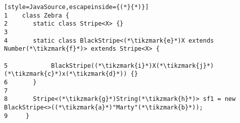 \documentclass{article}
\begin{document}


\begin{lstlisting}[style=JavaSource,escapeinside={(*}{*)}]
1    class Zebra {
2       static class Stripe<X> {}
3
4       static class BlackStripe<(*\tikzmark{e}*)X extends Number(*\tikzmark{f}*)> extends Stripe<X> {
       
5            BlackStripe((*\tikzmark{i}*)X(*\tikzmark{j}*) (*\tikzmark{c}*)x(*\tikzmark{d}*)) {}
6       }
7
8       Stripe<(*\tikzmark{g}*)String(*\tikzmark{h}*)> sf1 = new BlackStripe<>((*\tikzmark{a}*)"Marty"(*\tikzmark{b}*));
9     }
\end{lstlisting}
\end{document}

